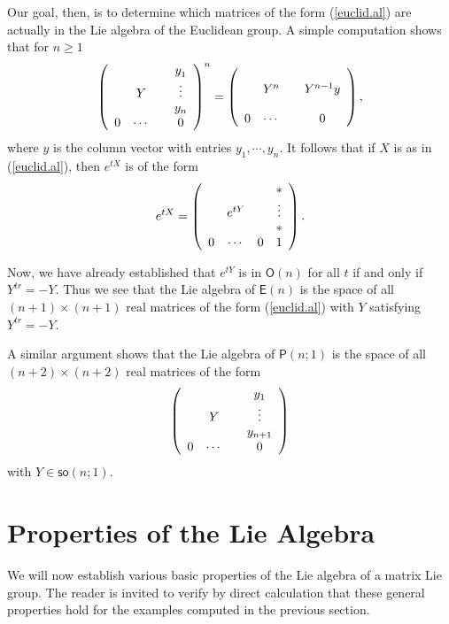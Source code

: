 \documentclass{amsbook}
\theoremstyle{plain}
\numberwithin{equation}{chapter}
\numberwithin{theorem}{chapter}
\begin{document}
Our goal, then, is to determine which matrices of the form (\ref{euclid.al})
are actually in the Lie algebra of the Euclidean group. A simple computation
shows that for $n\geq1$
\[
\left(
\begin{array}
[c]{cccc}%
&  &  & y_{1}^{{}}\\
& Y &  & \vdots\\
&  &  &  y_{n}\\
0 & \cdots &  & 0
\end{array}
\right)  ^{n}=\left(
\begin{array}
[c]{cccc}%
&  &  & \\
& Y^{n} &  & Y^{n-1}y\\
&  &  & \\
0 & \cdots &  & 0
\end{array}
\right)  ,
\]
where $y$ is the column vector with entries $y_{1},\cdots,y_{n}.$ It follows
that if $X$ is as in (\ref{euclid.al}), then $e^{tX}$ is of the form
\[
e^{tX}=\left(
\begin{array}
[c]{cccc}%
&  &  & \ast\\
&  e^{tY} &  & \vdots\\
&  &  & \ast\\
0 & \cdots & 0 & 1
\end{array}
\right)  \text{.}%
\]

Now, we have already established that $e^{tY}$ is in $\mathsf{O}(n)$ for all
$t$ if and only if $Y^{tr}=-Y$. Thus we see that the Lie algebra of
$\mathsf{E}(n)$ is the space of all $(n+1)\times(n+1)$ real matrices of the
form (\ref{euclid.al}) with $Y$ satisfying $Y^{tr}=-Y$.

A similar argument shows that the Lie algebra of $\mathsf{P}(n;1)$ is the
space of all $(n+2)\times(n+2)$ real matrices of the form
\[
\left(
\begin{array}
[c]{cccc}%
&  &  & y_{1}\\
& Y &  & \vdots\\
&  &  &  y_{n+1}\\
0 & \cdots &  & 0
\end{array}
\right)
\]
with $Y\in\mathsf{so}(n;1)$.

\section{Properties of the Lie Algebra}

We will now establish various basic properties of the Lie algebra of a matrix
Lie group. The reader is invited to verify by direct calculation that these
general properties hold for the examples computed in the previous section.
\end{document}
